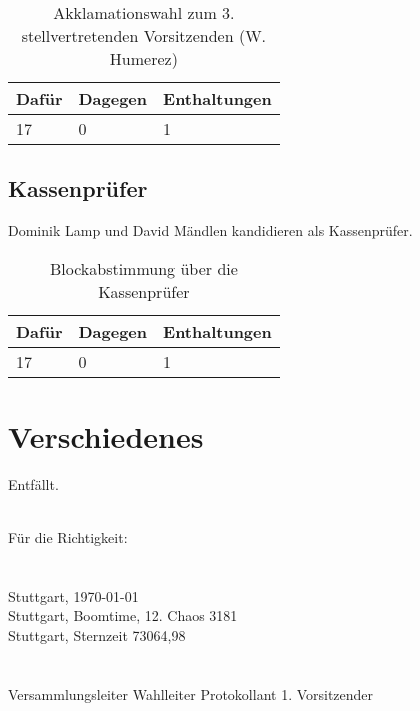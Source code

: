 \documentclass[a4paper]{scrartcl}
\begin{document}
\begin{table}[h]
	\begin{tabularx}{\textwidth}{XXX}
		Dafür & Dagegen & Enthaltungen\\
		\toprule
		17 & 0 & 1\\
	\end{tabularx}
	\caption{Akklamationswahl zum 3. stellvertretenden Vorsitzenden (W. Humerez)}
\end{table}

\subsection{Kassenprüfer}
Dominik Lamp und David Mändlen kandidieren als Kassenprüfer.

\begin{table}[h]
	\begin{tabularx}{\textwidth}{XXX}
		Dafür & Dagegen & Enthaltungen\\
		\toprule
		17 & 0 & 1\\
	\end{tabularx}
	\caption{Blockabstimmung über die Kassenprüfer}
\end{table}

\clearpage

\section{Verschiedenes }
Entfällt.

\vfill
\mbox{}\\
Für die Richtigkeit:\\
\\
\\
Stuttgart, \today\\
Stuttgart, Boomtime, 12. Chaos 3181\\
Stuttgart, Sternzeit 73064,98\\
\\
\\
\hfill Versammlungsleiter \hfill Wahlleiter \hfill Protokollant \hfill 1. Vorsitzender \hfill
\end{document}
